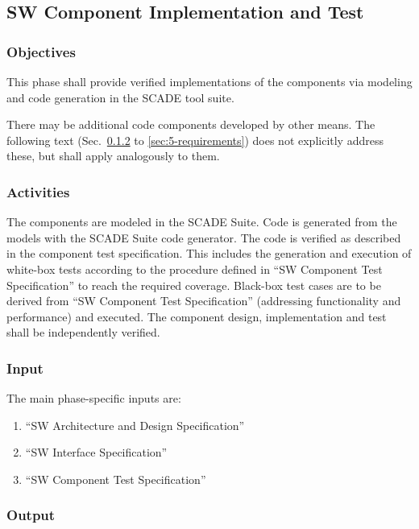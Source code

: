 \documentclass{template/openetcs_article}
\begin{document}
\subsection{SW Component Implementation and Test}
\label{sec:sw-component-implementation}

\subsubsection{Objectives}
\label{sec:5-objectives}

This phase shall provide verified implementations of the components
via modeling and code generation in the SCADE tool suite. 

There may be additional code components developed by other
means. The following text (Sec.~\ref{sec:5-activities} to
\ref{sec:5-requirements}) does not explicitly address these, but shall
apply analogously to them.  



\subsubsection{Activities}
\label{sec:5-activities}

The components are modeled in the SCADE Suite. Code is generated from
the models with the SCADE Suite code generator. The code is verified
as described in the component test specification. This includes the
generation and execution of white-box tests according to the procedure
defined in ``SW Component Test Specification'' to reach the required
coverage. Black-box test cases are to be derived from ``SW
Component Test Specification'' (addressing functionality and
performance) and executed. The component design, implementation and
test shall be independently verified. 

\subsubsection{Input}
\label{sec:5-input}

The main phase-specific inputs are:
\begin{enumerate}
\item ``SW Architecture and Design Specification''
\item ``SW Interface Specification''
\item ``SW Component Test Specification''
\end{enumerate}

\subsubsection{Output}
\label{sec:5-output}
\end{document}

